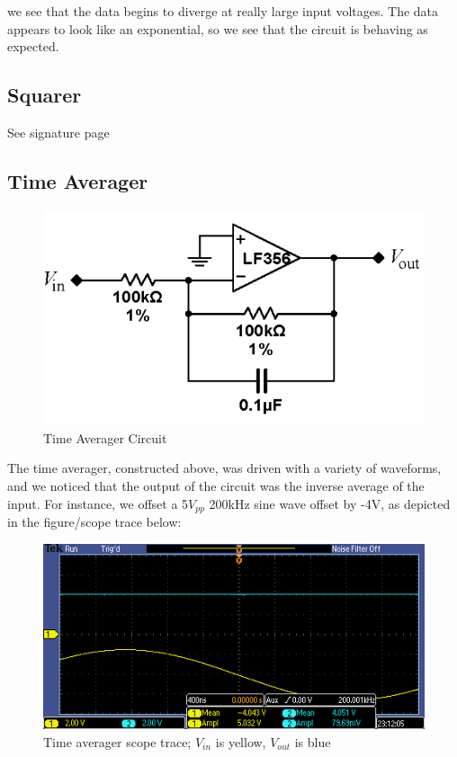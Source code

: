 \documentclass{article}
\begin{document}
    we see that the data begins to diverge at really large input voltages. The data appears to look like an exponential, so we see that the circuit is behaving as expected.
    
    \subsection{Squarer}
        See signature page
    \subsection{Time Averager}
    \begin{figure}[H]
        \centering
        \includegraphics[scale = 0.6]{10.png}
        \caption{Time Averager Circuit \cite{lab7}}
        \label{fig:my_label}
    \end{figure}
    The time averager, constructed above, was driven with a variety of waveforms, and we noticed that the output of the circuit was the inverse average of the input. For instance, we offset a 5$V_{pp}$ 200kHz sine wave offset by -4V, as depicted in the figure/scope trace below:
    \begin{figure}[H]
        \centering
        \includegraphics[scale = 0.6]{10b.PNG}
        \caption{Time averager scope trace; $V_{in}$ is yellow, $V_{out}$ is blue}
        \label{fig:my_label}
    \end{figure}
\end{document}
